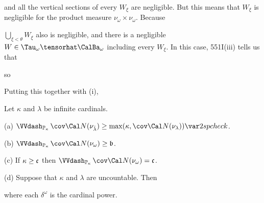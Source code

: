 {\noindent and all the vertical sections of every $W_{\xi}$ are negligible.   But
this means that $W_{\xi}$ is negligible for the product measure
$\nu_{\omega}\times\nu_{\omega}$.   Because


\noindent
$\bigcup_{\xi<\theta}W_{\xi}$ also is negligible, and there is a negligible
$W\in\Tau_{\omega}\tensorhat\CalBa_{\omega}$ including every $W_{\xi}$.
In this case, 551I(iii) tells us that


\noindent so


Putting this together with (i),

}%

 Let $\kappa$ and $\lambda$ be infinite cardinals.

(a) $\VVdPk\,\cov\Cal N(\nu_{\check\lambda})
\ge\max(\kappa,\cov\Cal N(\nu_{\lambda}))\var2spcheck$.

(b)
$\VVdPk\,\cov\Cal N(\nu_{\omega})\ge\frak b$.

(c)
If $\kappa\ge\frak c$ then
$\VVdPk\,\cov\Cal N(\nu_{\omega})=\frak c$.

(d) Suppose that $\kappa$ and $\lambda$
are uncountable.   Then


\noindent where each $\delta^{\omega}$ is the cardinal power.


